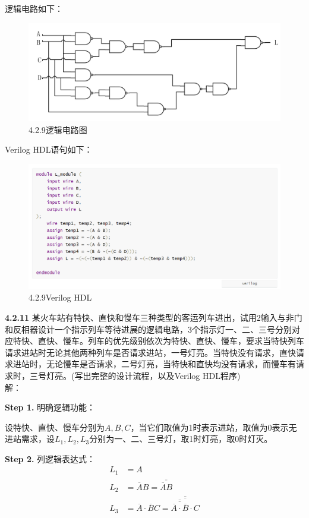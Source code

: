 \documentclass[a4paper,11pt,UTF8]{article}
\begin{document}
逻辑电路如下：
\begin{figure}[H]
	\centering
	\includegraphics[scale=0.25]{SD4.2.9_2}
	\caption{4.2.9逻辑电路图}
\end{figure}
Verilog HDL语句如下：
\begin{figure}[H]
	\centering
	\includegraphics[scale=0.35]{SD4.2.9_3}
	\caption{4.2.9Verilog HDL}
\end{figure}
\textbf{4.2.11} 某火车站有特快、直快和慢车三种类型的客运列车进出，试用2输入与非门和反相器设计一个指示列车等待进展的逻辑电路，3个指示灯一、二、三号分别对应特快、直快、慢车。列车的优先级别依次为特快、直快、慢车，要求当特快列车请求进站时无论其他两种列车是否请求进站，一号灯亮。当特快没有请求，直快请求进站时，无论慢车是否请求，二号灯亮，当特快和直快均没有请求，而慢车有请求时，三号灯亮。(写出完整的设计流程，以及Verilog HDL程序)\\
解：

\textbf{Step 1.} 明确逻辑功能：

设特快、直快、慢车分别为$A,B,C$，当它们取值为1时表示进站，取值为0表示无进站需求，设$L_1,L_2,L_3$分别为一、二、三号灯，取1时灯亮，取0时灯灭。

\textbf{Step 2.} 列逻辑表达式：
$$\begin{aligned}
	L_1&=A\\
	L_2&=\overline{A}B=\overline{\overline{\overline{A}B}}\\
	L_3&=\overline{A}\cdot\overline{B}C=\overline{\overline{\overline{\overline{\overline{A}\cdot\overline{B}}}\cdot C}}\\
\end{aligned}
$$
\end{document}
